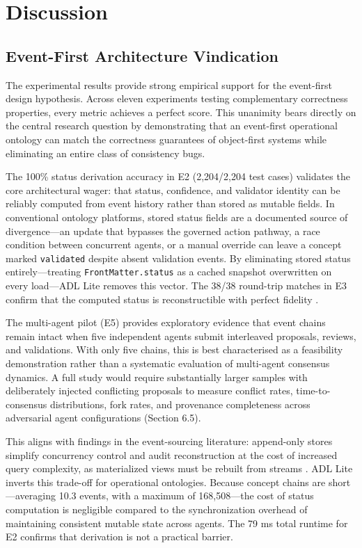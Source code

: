 \section{Discussion}\label{discussion}

\subsection{Event-First Architecture Vindication}\label{event-first-architecture-vindication}

The experimental results provide strong empirical support for the event-first design hypothesis. Across eleven experiments testing complementary correctness properties, every metric achieves a perfect score. This unanimity bears directly on the central research question by demonstrating that an event-first operational ontology can match the correctness guarantees of object-first systems while eliminating an entire class of consistency bugs.

The 100\% status derivation accuracy in E2 (2,204/2,204 test cases) validates the core architectural wager: that status, confidence, and validator identity can be reliably computed from event history rather than stored as mutable fields. In conventional ontology platforms, stored status fields are a documented source of divergence---an update that bypasses the governed action pathway, a race condition between concurrent agents, or a manual override can leave a concept marked \texttt{validated} despite absent validation events. By eliminating stored status entirely---treating \texttt{FrontMatter.status} as a cached snapshot overwritten on every load---ADL Lite removes this vector. The 38/38 round-trip matches in E3 confirm that the computed status is reconstructible with perfect fidelity \cite{ref3}\cite{ref14}.

The multi-agent pilot (E5) provides exploratory evidence that event chains remain intact when five independent agents submit interleaved proposals, reviews, and validations. With only five chains, this is best characterised as a feasibility demonstration rather than a systematic evaluation of multi-agent consensus dynamics. A full study would require substantially larger samples with deliberately injected conflicting proposals to measure conflict rates, time-to-consensus distributions, fork rates, and provenance completeness across adversarial agent configurations (Section 6.5).

This aligns with findings in the event-sourcing literature: append-only stores simplify concurrency control and audit reconstruction at the cost of increased query complexity, as materialized views must be rebuilt from streams \cite{ref12}. ADL Lite inverts this trade-off for operational ontologies. Because concept chains are short---averaging 10.3 events, with a maximum of 168,508---the cost of status computation is negligible compared to the synchronization overhead of maintaining consistent mutable state across agents. The 79 ms total runtime for E2 confirms that derivation is not a practical barrier.

